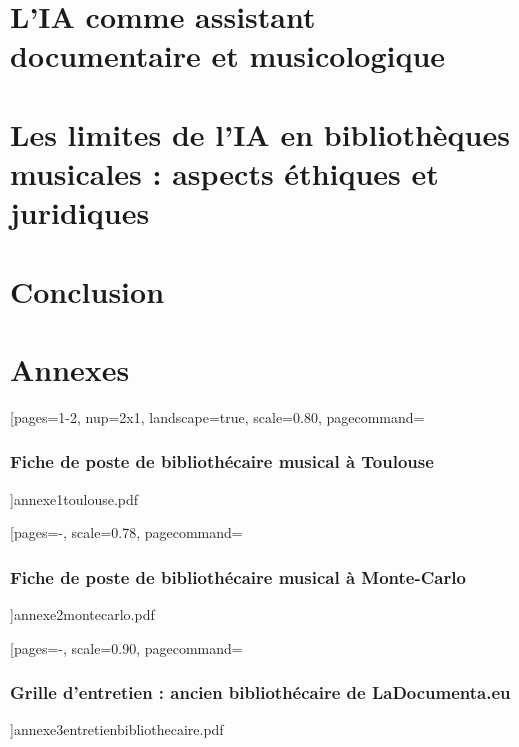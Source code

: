 \documentclass[12pt,twoside]{book}
\begin{document}
	\chapter{L'IA comme assistant documentaire et musicologique}

	
	\chapter{Les limites de l'IA en bibliothèques musicales : aspects éthiques et juridiques }

	
	\chapter*{Conclusion}
	\newpage{\pagestyle{empty}\cleardoublepage}
	
	
	
	

	
	
	
\appendix %

\chapter*{Annexes} %



[pages=1-2, 
nup=2x1, 
landscape=true, 
scale=0.80, 
pagecommand={\subsection*{Fiche de poste de bibliothécaire musical à Toulouse}}]{annexe1toulouse.pdf}



[pages={-},
scale=0.78,
pagecommand=\subsection*{Fiche de poste de bibliothécaire musical à Monte-Carlo}]{annexe2montecarlo.pdf}



[pages={-},
scale=0.90,
pagecommand={\subsection*{Grille d'entretien : ancien bibliothécaire de LaDocumenta.eu}}]{annexe3entretienbibliothecaire.pdf}
\end{document}
